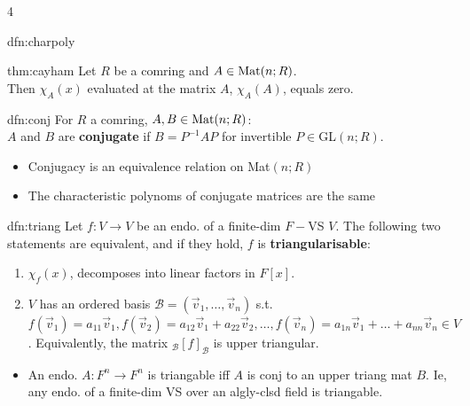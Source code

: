 \documentclass[landscape, 8pt]{extarticle}
\begin{document}
\begin{multicols*}{4}
\begin{dfn}{dfn:charpoly}{ }
		\end{dfn}
		
		
		\begin{thm}{thm:cayham}{ }
		Let $R$ be a comring and $A \in \operatorname{Mat}(n; R)$. \\
		Then $\chi_A(x)$ evaluated at the matrix $A$, $\chi_A(A)$, equals zero.
		
		\end{thm}
		
		
		\begin{dfn}[Conjugacy]{dfn:conj}{ }
			For $R$ a comring, $A, B \in \operatorname{Mat}(n; R)$:\\
			$A$ and $B$ are \textbf{conjugate} if $B = P^{-1}AP$ for invertible $P \in $GL$(n; R)$. 
			\begin{itemize}
				\item Conjugacy is an equivalence relation on Mat$(n; R)$
				\item The characteristic polynoms of conjugate matrices are the same
			\end{itemize}
			
		\end{dfn}
		
		
		\begin{dfn}[Triangularisability]{dfn:triang}{ }
			Let $f: V \to V$ be an endo. of a finite-dim $F-$VS $V$. The following two statements are equivalent, and if they hold, $f$ is \textbf{triangularisable}:
			\begin{enumerate}[label=(\arabic*)]
				\item $\chi_f (x)$, decomposes into linear factors in $F[x]$.
				\item $V$ has an ordered basis $\mathcal{B} = (\vec{v}_1, \dots, \vec{v}_n)$ s.t. $f(\vec{v}_1) = a_{11}\vec{v}_1, f(\vec{v}_2) = a_{12}\vec{v}_1 + a_{22} \vec{v}_2, \dots, f(\vec{v}_n) = a_{1n}\vec{v}_1 + \dots + a_{nn}\vec{v}_n \in V$. Equivalently, the matrix $_\mathcal{B}[f]_\mathcal{B}$ is upper triangular.
			\end{enumerate}
			\begin{itemize}
				\item An endo. $A : F^n \to F^n$ is triangable iff $A$ is conj to an upper triang mat $B$. Ie, any endo. of a finite-dim VS over an algly-clsd field is triangable.
			\end{itemize}
			
		\end{dfn}
		

\end{multicols*}
\end{document}

